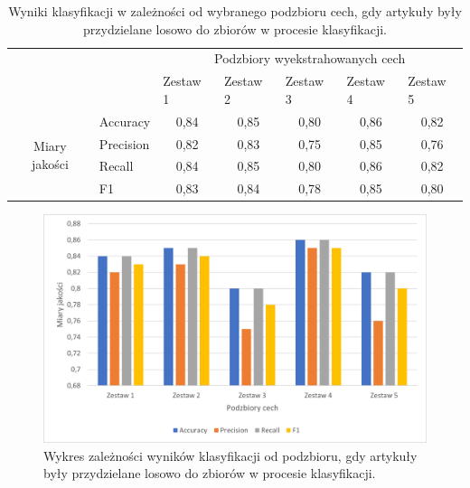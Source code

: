 \documentclass{classrep}
\begin{document}
\begin{table}[!htbp]
\caption{Wyniki klasyfikacji w zależności od wybranego podzbioru cech, gdy artykuły były przydzielane losowo do zbiorów w procesie klasyfikacji.}
\centering
\label{table:podzbiory}
\begin{tabular}{cl|c|c|c|c|c|}
\cline{3-7}
\multicolumn{1}{l}{}                                 &           & \multicolumn{5}{c|}{Podzbiory wyekstrahowanych cech}                                                                                                          \\ \cline{3-7} 
\multicolumn{1}{l}{}                                 &           & \multicolumn{1}{l|}{Zestaw 1} & \multicolumn{1}{l|}{Zestaw 2} & \multicolumn{1}{l|}{Zestaw 3} & \multicolumn{1}{l|}{Zestaw 4} & \multicolumn{1}{l|}{Zestaw 5} \\ \hline
\multicolumn{1}{|c|}{\multirow{4}{*}{Miary jakości}} & Accuracy  & 0,84                          & 0,85                          & 0,80                          & 0,86                          & 0,82                          \\ \cline{2-7} 
\multicolumn{1}{|c|}{}                               & Precision & 0,82                          & 0,83                          & 0,75                          & 0,85                          & 0,76                          \\ \cline{2-7} 
\multicolumn{1}{|c|}{}                               & Recall    & 0,84                          & 0,85                          & 0,80                          & 0,86                          & 0,82                          \\ \cline{2-7} 
\multicolumn{1}{|c|}{}                               & F1        & 0,83                          & 0,84                          & 0,78                          & 0,85                          & 0,80                          \\ \hline
\end{tabular}
\end{table}
\begin{figure}[H]
    \centering
    \includegraphics[width=14cm]{features_sets_bar_chart.png}
    \caption{Wykres zależności wyników klasyfikacji od podzbioru, gdy artykuły były przydzielane losowo do zbiorów w procesie klasyfikacji.}
    \label{rysunek:podzbiory}
\end{figure}
\end{document}
